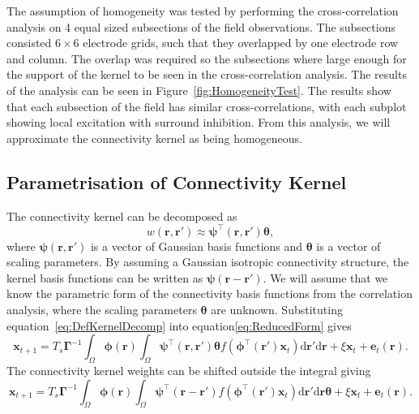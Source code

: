 \documentclass[]{article}
\begin{document}
The assumption of homogeneity was tested by performing the cross-correlation analysis on 4 equal sized subsections of the field observations. The subsections consisted $6\times6$ electrode grids, such that they overlapped by one electrode row and column. The overlap was required so the subsections where large enough for the support of the kernel to be seen in the cross-correlation analysis. The results of the analysis can be seen in Figure~\ref{fig:HomogeneityTest}. The results show that each subsection of the field has similar cross-correlations, with each subplot showing local excitation with surround inhibition. From this analysis, we will approximate the connectivity kernel as being homogeneous.

\subsection{Parametrisation of Connectivity Kernel}
The connectivity kernel can be decomposed as 
\begin{equation}\label{eq:DefKernelDecomp}
	 w\left(\mathbf{r},\mathbf{r}'\right) \approx \boldsymbol{\psi}^\top\left(\mathbf{r},\mathbf{r}'\right) \boldsymbol{\theta},
\end{equation}
where $\boldsymbol{\psi}(\mathbf{r},\mathbf{r}')$ is a vector of Gaussian basis functions and $\boldsymbol{\theta}$ is a vector of scaling parameters. By assuming a Gaussian isotropic connectivity structure, the kernel basis functions can be written as $\boldsymbol{\psi}(\mathbf{r}-\mathbf{r}')$. We will assume that we know the parametric form of the connectivity basis functions from the correlation analysis, where the scaling parameters $\boldsymbol{\theta}$ are unknown.
Substituting equation~\ref{eq:DefKernelDecomp} into equation\ref{eq:ReducedForm} gives
\begin{equation}\label{eq:KernelDecompForm}
	 \mathbf{x}_{t+1} = T_s\boldsymbol{\Gamma}^{-1}
	 \int_\Omega \boldsymbol{\phi}(\mathbf{r}) 
	 \int_\Omega \boldsymbol{\psi}^\top\left(\mathbf{r},\mathbf{r}'\right) \boldsymbol{\theta} f(\boldsymbol{\phi}^{\top} (\mathbf{r}')\mathbf{x}_t) \textrm{d}\mathbf{r}' \textrm{d}\mathbf{r} 
	 + \xi\mathbf{x}_t + \mathbf{e}_t(\mathbf{r}).
\end{equation}
The connectivity kernel weights can be shifted outside the integral giving
\begin{equation}
	 \mathbf{x}_{t+1} = T_s\boldsymbol{\Gamma}^{-1}
	 \int_\Omega \boldsymbol{\phi}(\mathbf{r}) 
	 \int_\Omega \boldsymbol{\psi}^{\top} (\mathbf{r}-\mathbf{r}')f(\boldsymbol{\phi}^{\top}(\mathbf{r}')\mathbf{x}_t) \textrm{d}\mathbf{r}' \textrm{d}\mathbf{r} \boldsymbol{\theta}  
	 + \xi\mathbf{x}_t + \mathbf{e}_t(\mathbf{r}).
\end{equation}
\end{document}
